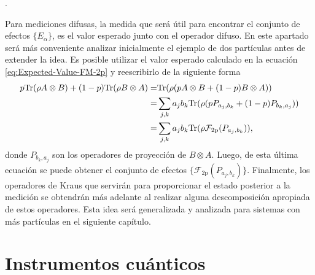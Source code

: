 

.

Para mediciones difusas, la medida que será útil para encontrar el conjunto de efectos $\{E_\alpha\}$, es el valor esperado junto con el operador difuso. En este apartado será más conveniente analizar inicialmente el ejemplo de dos partículas antes de extender la idea.  Es posible utilizar el valor esperado calculado en la ecuación {\eqref{eq:Expected-Value-FM-2p}} y reescribirlo de la siguiente forma\begin{equation}\label{eq:ordenar-valoresperado-povm}\begin{split}
    p{\rm Tr}(\rho A\otimes B)+ (1-p){\rm Tr}(\rho B\otimes A)=& {\rm Tr}(\rho (pA\otimes B+(1-p)B\otimes A))\\
    =&\sum_{j,k}{a_j b_k}{\rm Tr}(\rho (pP_{a_j,b_k}+(1-p)P_{b_k, a_j}))\\
    =&\sum_{j, k}{a_j b_k}{\rm Tr}(\rho \mathcal{F}_{2\text{p}}(P_{a_j,b_k})),\\
\end{split}
\end{equation} donde $P_{b_k,a_j}$ son los operadores de proyección de $B\otimes A$. Luego, de esta última ecuación se puede obtener el conjunto de efectos $\{\mathcal{F}_{2\text{p}}(P_{a_j,b_k})\}$. Finalmente, los operadores de Kraus que servirán para proporcionar el estado posterior a la medición se obtendrán más adelante al realizar alguna descomposición apropiada de estos operadores. Esta idea será generalizada y analizada para sistemas con más partículas en el siguiente capítulo. 


\section{Instrumentos cuánticos}\label{sec:cap2instrumentos-cuanticos} %

